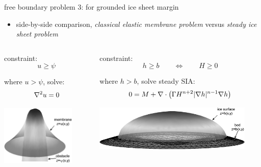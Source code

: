 \begin{frame}{free boundary problem 3: for grounded ice sheet margin}

\begin{itemize}
\item side-by-side comparison, \emph{classical elastic membrane problem} versus \emph{steady ice sheet problem}
\end{itemize}
\small
\begin{columns}[T]
\begin{column}{0.4\textwidth}
constraint:
  $$u \ge \psi$$

where $u>\psi$, solve:
  $$\nabla^2 u = 0$$

\bigskip
\includegraphics[width=0.8\textwidth]{photos/classicalobs}
\end{column}
\begin{column}{0.6\textwidth}
constraint:
  $$h \ge b \qquad \iff \qquad H \ge 0$$

where $h>b$, solve steady SIA:
  $$0 = M + \nabla\cdot \left(\Gamma H^{n+2} |\nabla h|^{n-1} \nabla h \right)$$

\bigskip
\includegraphics[width=0.9\textwidth]{photos/capnonflatobs}
\end{column}
\end{columns}
\end{frame}


